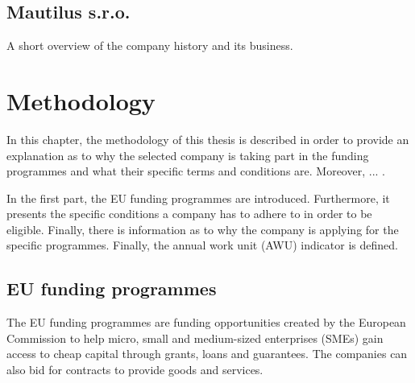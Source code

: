 \documentclass[12pt,oneside]{fithesis2}
\begin{document}
    \section{Mautilus s.r.o.}
    A short overview of the company history and its business.
    \chapter{Methodology}
    In this chapter, the methodology of this thesis is described in order to provide an explanation as to why the selected company is taking part in the funding programmes and what their specific terms and conditions are. Moreover, ... .
    \par
    In the first part, the EU funding programmes are introduced. Furthermore, it presents the specific conditions a company has to adhere to in order to be eligible. Finally, there is information as to why the company is applying for the specific programmes. Finally, the annual work unit (AWU) indicator is defined.
    \section{EU funding programmes}
    The EU funding programmes are funding opportunities created by the European Commission to help micro, small and medium-sized enterprises (SMEs) gain access to cheap capital through grants, loans and guarantees. The companies can also bid for contracts to provide goods and services.
\end{document}
